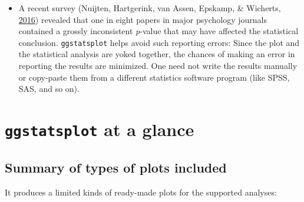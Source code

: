 \documentclass[
]{article}
\providecommand{\tightlist}{%
  \setlength{\itemsep}{0pt}\setlength{\parskip}{0pt}}
\begin{document}
\begin{itemize}
\tightlist
\item
  A recent survey (Nuijten, Hartgerink, van Assen, Epskamp, \& Wicherts, \protect\hyperlink{ref-nuijtenPrevalenceStatisticalReporting2016}{2016}) revealed that
  one in eight papers in major psychology journals contained a grossly
  inconsistent \emph{p}-value that may have affected the statistical conclusion.
  \texttt{ggstatsplot} helps avoid such reporting errors: Since the plot and the
  statistical analysis are yoked together, the chances of making an error in
  reporting the results are minimized. One need not write the results manually
  or copy-paste them from a different statistics software program (like SPSS,
  SAS, and so on).
\end{itemize}

\hypertarget{ggstatsplot-at-a-glance}{%
\section{\texorpdfstring{\texttt{ggstatsplot} at a glance}{ggstatsplot at a glance}}\label{ggstatsplot-at-a-glance}}

\hypertarget{summary-of-types-of-plots-included}{%
\subsection{Summary of types of plots included}\label{summary-of-types-of-plots-included}}

It produces a limited kinds of ready-made plots for the supported analyses:
\end{document}
